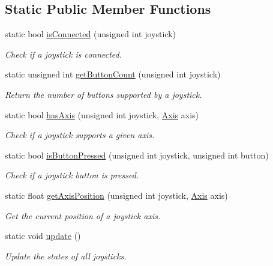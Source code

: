 \subsection*{Static Public Member Functions}
\begin{DoxyCompactItemize}
\item 
static bool \hyperlink{classsf_1_1_joystick_ac7d4e1923e9f9420174f26703ea63d6c}{is\+Connected} (unsigned int joystick)
\begin{DoxyCompactList}\small\item\em Check if a joystick is connected. \end{DoxyCompactList}\item 
static unsigned int \hyperlink{classsf_1_1_joystick_a4de9f445c6582bfe9f0873f695682885}{get\+Button\+Count} (unsigned int joystick)
\begin{DoxyCompactList}\small\item\em Return the number of buttons supported by a joystick. \end{DoxyCompactList}\item 
static bool \hyperlink{classsf_1_1_joystick_a268e8f2a11ae6af4a47c727cb4ab4d95}{has\+Axis} (unsigned int joystick, \hyperlink{classsf_1_1_joystick_a48db337092c2e263774f94de6d50baa7}{Axis} axis)
\begin{DoxyCompactList}\small\item\em Check if a joystick supports a given axis. \end{DoxyCompactList}\item 
static bool \hyperlink{classsf_1_1_joystick_ae0d97a4b84268cbe6a7078e1b2717835}{is\+Button\+Pressed} (unsigned int joystick, unsigned int button)
\begin{DoxyCompactList}\small\item\em Check if a joystick button is pressed. \end{DoxyCompactList}\item 
static float \hyperlink{classsf_1_1_joystick_aea4930193331df1851b709f3060ba58b}{get\+Axis\+Position} (unsigned int joystick, \hyperlink{classsf_1_1_joystick_a48db337092c2e263774f94de6d50baa7}{Axis} axis)
\begin{DoxyCompactList}\small\item\em Get the current position of a joystick axis. \end{DoxyCompactList}\item 
static void \hyperlink{classsf_1_1_joystick_ab85fa9175b4edd3e5a07ee3cde0b0f48}{update} ()
\begin{DoxyCompactList}\small\item\em Update the states of all joysticks. \end{DoxyCompactList}\end{DoxyCompactItemize}


